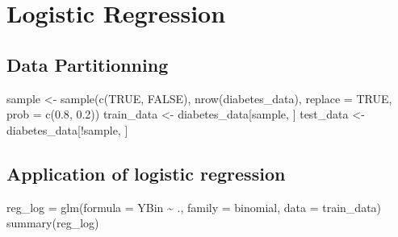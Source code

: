 \documentclass[
]{article}
\newenvironment{Shaded}{\begin{snugshade}}{\end{snugshade}}
\newcommand{\AttributeTok}[1]{\textcolor[rgb]{0.77,0.63,0.00}{#1}}
\newcommand{\ConstantTok}[1]{\textcolor[rgb]{0.00,0.00,0.00}{#1}}
\newcommand{\FloatTok}[1]{\textcolor[rgb]{0.00,0.00,0.81}{#1}}
\newcommand{\FunctionTok}[1]{\textcolor[rgb]{0.00,0.00,0.00}{#1}}
\newcommand{\NormalTok}[1]{#1}
\newcommand{\OtherTok}[1]{\textcolor[rgb]{0.56,0.35,0.01}{#1}}
\newcommand{\SpecialCharTok}[1]{\textcolor[rgb]{0.00,0.00,0.00}{#1}}
\begin{document}
\hypertarget{logistic-regression}{%
\section{Logistic Regression}\label{logistic-regression}}

\hypertarget{data-partitionning}{%
\subsection{Data Partitionning}\label{data-partitionning}}

\begin{Shaded}
\begin{Highlighting}[]
\NormalTok{sample }\OtherTok{\textless{}{-}} \FunctionTok{sample}\NormalTok{(}\FunctionTok{c}\NormalTok{(}\ConstantTok{TRUE}\NormalTok{, }\ConstantTok{FALSE}\NormalTok{), }\FunctionTok{nrow}\NormalTok{(diabetes\_data), }\AttributeTok{replace =} \ConstantTok{TRUE}\NormalTok{, }\AttributeTok{prob =} \FunctionTok{c}\NormalTok{(}\FloatTok{0.8}\NormalTok{, }\FloatTok{0.2}\NormalTok{))}
\NormalTok{train\_data }\OtherTok{\textless{}{-}}\NormalTok{ diabetes\_data[sample, ]}
\NormalTok{test\_data }\OtherTok{\textless{}{-}}\NormalTok{ diabetes\_data[}\SpecialCharTok{!}\NormalTok{sample, ]}
\end{Highlighting}
\end{Shaded}

\hypertarget{application-of-logistic-regression}{%
\subsection{Application of logistic
regression}\label{application-of-logistic-regression}}

\begin{Shaded}
\begin{Highlighting}[]
\NormalTok{reg\_log }\OtherTok{=} \FunctionTok{glm}\NormalTok{(}\AttributeTok{formula =}\NormalTok{ YBin }\SpecialCharTok{\textasciitilde{}}\NormalTok{ ., }\AttributeTok{family =}\NormalTok{ binomial, }\AttributeTok{data =}\NormalTok{ train\_data)}
\FunctionTok{summary}\NormalTok{(reg\_log)}
\end{Highlighting}
\end{Shaded}
\end{document}
